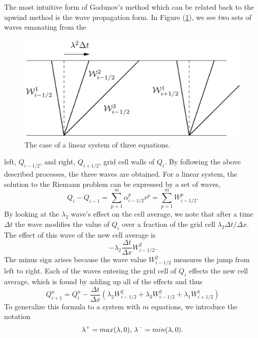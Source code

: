 \documentclass[]{article}
\begin{document}
	The most intuitive form of Godunov's method which can be related back to the upwind method is the wave propagation form. In Figure (\ref{WavePropGodMeth}), we see two sets of waves emanating from the
	\begin{figure}[h] 	
		\centering
		\includegraphics[scale=.50]{WavePropGodMeth}
		\caption{The case of a linear system of three equations.}
		\label{WavePropGodMeth}
	\end{figure}
	left, $ Q_{i-1/2} $, and right, $ Q_{i+1/2} $, grid cell walls of $ Q_i $. By following the above described processes, the three waves are obtained. For a linear system, the solution to the Riemann problem can be expressed by a set of waves,
	\begin{equation}
		Q_{i} - Q_{i-1} = \sum_{p = 1}^{m} \alpha^p_{i-1/2}r^p = \sum_{p = 1}^{m}W^p_{i-1/2}.
	\end{equation}
	By looking at the $ \lambda_2 $ wave's effect on the cell average, we note that after a time $ \Delta t $ the wave modifies the value of $ Q_i $ over a fraction of the grid cell $ \lambda_2 \Delta t / \Delta x $. The effect of this wave of the new cell average is
	\begin{equation}
		-\lambda_2 \frac{\Delta t}{\Delta x}W_{i-1/2}^2.
	\end{equation}
	The minus sign arises because the wave value $ W_{i-1/2}^2 $ measures the jump from left to right. Each of the waves entering the grid cell of $ Q_{i} $ effects the new cell average, which is found by adding up all of the effects and thus
	\begin{equation}
		Q^n_{i+1} = Q_i^n - \frac{\Delta t}{\Delta x} (\lambda_2 W^2_{i-1/2} + \lambda_3 W^3_{i-1/2} + \lambda_1 W^1_{i+1/2})
	\end{equation}
	To generalize this formula to a system with $ m $ equations, we introduce the notation
	\begin{equation}
		\lambda^+ = max(\lambda, 0) \mbox{,\space} \lambda^- = min(\lambda, 0).
	\end{equation}
\end{document}
